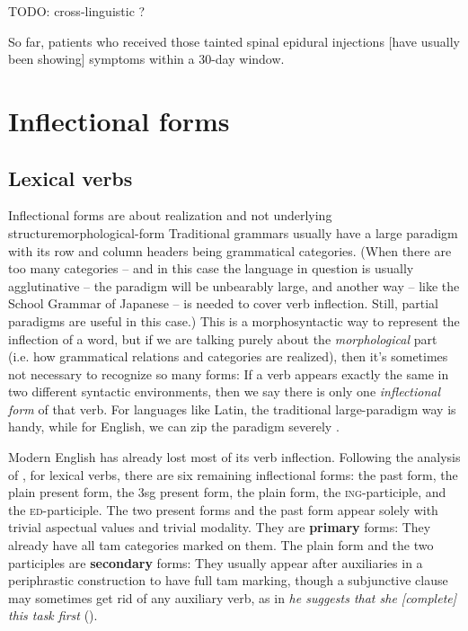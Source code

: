 \documentclass[UTF8, a4paper, oneside, scheme=plain]{ctexrep}
\newcommand*{\citesec}[1]{\S~{#1}}
\newcommand*{\citechap}[1]{Ch~{#1}}
\newcommand*{\citechapsec}[2]{\citechap{#1}.\citesec{#2}}
\newcommand*{\concept}[1]{\textbf{#1}}
\newcommand{\corpus}[1]{\emph{#1}}
\newcommand{\corpuscat}[1]{\textsc{#1}}
\begin{document}
TODO: cross-linguistic ?

\begin{exe}
    \ex\label{ex:verb-inflection.overview.1} So far, patients who received those tainted spinal epidural injections [have usually been showing] symptoms within a 30-day window.
\end{exe}

\section{Inflectional forms}\label{sec:verb-forms}

\subsection{Lexical verbs}

\begin{theorybox}{Inflectional forms are about realization and not underlying structure}{morphological-form}
    Traditional grammars usually have a large paradigm
    with its row and column headers being grammatical categories.
    (When there are too many categories 
    -- and in this case the language in question is usually agglutinative -- 
    the paradigm will be unbearably large, 
    and another way -- like the School Grammar of Japanese -- is needed to cover verb inflection.
    Still, partial paradigms are useful in this case.) 
    This is a morphosyntactic way to represent the inflection of a word, 
    but if we are talking purely about the \emph{morphological} part
    (i.e. how grammatical relations and categories are realized),
    then it's sometimes not necessary to recognize so many forms:
    If a verb appears exactly the same in two different syntactic environments,
    then we say there is only one \emph{inflectional form} of that verb.
    For languages like Latin, 
    the traditional large-paradigm way is handy,
    while for English, we can zip the paradigm severely \citep[\citechapsec{3}{1.2}]{cgel}.
\end{theorybox}

Modern English has already lost most of its verb inflection.
Following the analysis of \citet[\citechapsec{3}{1.1}]{cgel},
for lexical verbs,
there are six remaining inflectional forms: 
the past form, the plain present form, 
the 3sg present form,
the plain form, the \corpuscat{ing}-participle,
and the \corpuscat{ed}-participle.
The two present forms and the past form appear solely 
with trivial aspectual values and trivial modality.
They are \concept{primary} forms:
They already have all \acs{tam} categories marked on them.
The plain form and the two participles are \concept{secondary} forms:
They usually appear after auxiliaries 
in a periphrastic construction to have full \acs{tam} marking,
though a subjunctive clause may sometimes get rid of any auxiliary verb,
as in \corpus{he suggests that she [complete] this task first} ().
\end{document}

